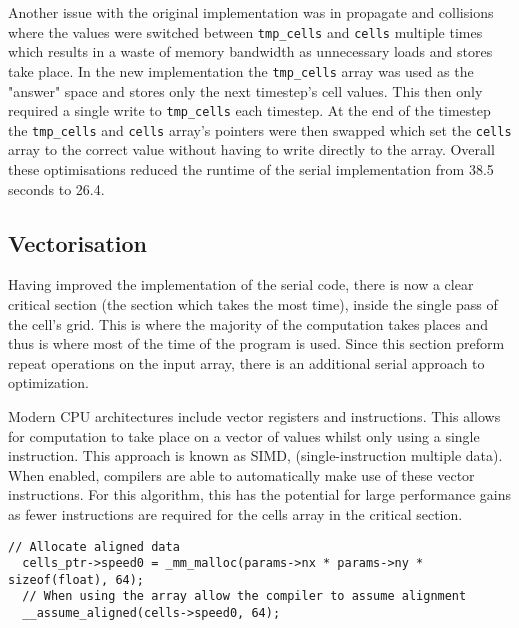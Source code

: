 \documentclass{article}
\begin{document}
\begin{multicols}{2}
Another issue with the original implementation was in  propagate and collisions
where the values were switched between \verb|tmp_cells| and \verb|cells| multiple
times which results in a waste of memory bandwidth as unnecessary loads and
stores take place. In the new implementation the \verb|tmp_cells| array was
used as the "answer" space and stores only the next timestep's cell values.
This then only required a single write to \verb|tmp_cells| each timestep. At
the end of the timestep the \verb|tmp_cells| and \verb|cells| array's pointers
were then swapped which set the \verb|cells| array to the correct value without
having to write directly to the array. Overall these optimisations reduced the 
runtime of the serial implementation from 38.5 seconds to 26.4.

\subsection{Vectorisation}

Having improved the implementation of the serial code, there is now a clear
critical section (the section which takes the most time), inside the single
pass of the cell's grid. This is where the majority of the computation takes places
and thus is where most of the time of the program is used. Since this section
preform repeat operations on the input array, there is an additional serial
approach to optimization.

Modern CPU architectures include vector registers and instructions. This allows
for computation to take place on a vector of values whilst only using a single
instruction. This approach is known as SIMD, (single-instruction multiple
data). When enabled, compilers are able to automatically make use of these
vector instructions. For this algorithm, this has the potential for large
performance gains as fewer instructions are required for the cells array in the
critical section.

\begin{lstlisting}[style=CStyle, label={lst:cellsdataalign}, caption={Example of memory allignment for a cells array.},]
  // Allocate aligned data
  cells_ptr->speed0 = _mm_malloc(params->nx * params->ny * sizeof(float), 64);
  // When using the array allow the compiler to assume alignment
  __assume_aligned(cells->speed0, 64);
\end{lstlisting}


\end{multicols}
\end{document}
